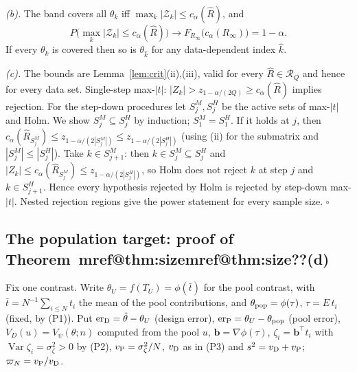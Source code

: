 \documentclass[pdflatex,sn-mathphys-num,iicol]{sn-jnl}
\makeatletter
\theoremstyle{thmstyleone}
\theoremstyle{thmstyletwo}
\theoremstyle{thmstylethree}
\newcommand{\Mref}[1]{\ifcsname mref@#1\endcsname\csname mref@#1\endcsname\else\textbf{??}\fi}
\makeatother
\begin{document}
\emph{(b).} The band covers all $\theta_k$ iff $\max_k|\mathcal Z_k|\le c_\alpha(\hat R)$, and
\[
P\big(\max_k|\mathcal Z_k|\le c_\alpha(\hat R)\big)\to F_{R_\infty}\big(c_\alpha(R_\infty)\big)=1-\alpha.
\]
 If every $\theta_k$ is covered then so is $\theta_{\hat k}$ for any data-dependent index $\hat k$.

\emph{(c).} The bounds are Lemma~\ref{lem:crit}(ii),(iii), valid for every $\hat R\in\mathcal R_Q$ and hence for every data set. Single-step max-$|t|$: $|Z_k|>z_{1-\alpha/(2Q)}\ge c_\alpha(\hat R)$ implies rejection. For the step-down procedures let $S^M_j,S^H_j$ be the active sets of max-$|t|$ and Holm. We show $S^M_j\subseteq S^H_j$ by induction; $S_1^M=S_1^H$. If it holds at $j$, then $c_\alpha(\hat R_{S^M_j})\le z_{1-\alpha/(2|S^M_j|)}\le z_{1-\alpha/(2|S^H_j|)}$ (using (ii) for the submatrix and $|S^M_j|\le|S^H_j|$). Take $k\in S^M_{j+1}$: then $k\in S^M_j\subseteq S^H_j$ and $|Z_k|\le c_\alpha(\hat R_{S^M_j})\le z_{1-\alpha/(2|S^H_j|)}$, so Holm does not reject $k$ at step $j$ and $k\in S^H_{j+1}$. Hence every hypothesis rejected by Holm is rejected by step-down max-$|t|$. Nested rejection regions give the power statement for every sample size. $\square$

\subsection{The population target: proof of Theorem~\Mref{thm:size}(d)}\label{si:testing-pop}

Fix one contrast. Write $\theta_U=f(T_U)=\phi(\bar t)$ for the pool contrast, with $\bar t=N^{-1}\sum_{i\le N}t_i$ the mean of the pool contributions, and $\theta_{\rm pop}=\phi(\tau)$, $\tau=E\,t_i$ (fixed, by (P1)). Put $\mathrm{er}_{\rm D}=\hat\theta-\theta_U$ (design error), $\mathrm{er}_{\rm P}=\theta_U-\theta_{\rm pop}$ (pool error), $V_D(u)=V_\psi(\theta;n)$ computed from the pool $u$, $\mathbf b=\nabla\phi(\tau)$, $\zeta_i=\mathbf b^\top t_i$ with $\operatorname{Var}\zeta_i=\sigma_\zeta^2>0$ by (P2), $v_{\rm P}=\sigma^2_\zeta/N$, $v_{\rm D}$ as in (P3) and $s^2=v_{\rm D}+v_{\rm P}$; $\varpi_N=v_{\rm P}/v_{\rm D}$.
\end{document}
